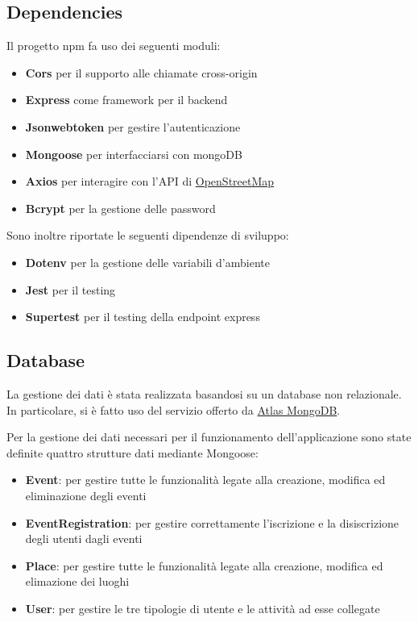 \documentclass[9pt]{extarticle}
\begin{document}
\subsection{Dependencies}

Il progetto npm fa uso dei seguenti moduli:
\begin{itemize}
    \item \textbf{Cors} per il supporto alle chiamate cross-origin
    \item \textbf{Express} come framework per il backend
    \item \textbf{Jsonwebtoken} per gestire l'autenticazione
    \item \textbf{Mongoose} per interfacciarsi con mongoDB
    \item \textbf{Axios} per interagire con l'API di \href{https://www.openstreetmap.org/#map=6/42.09/12.56}{OpenStreetMap}
    \item \textbf{Bcrypt} per la gestione delle password
\end{itemize}

Sono inoltre riportate le seguenti dipendenze di sviluppo:
\begin{itemize}
    \item \textbf{Dotenv} per la gestione delle variabili d'ambiente
    \item \textbf{Jest} per il testing
    \item \textbf{Supertest} per il testing della endpoint express
\end{itemize}

\subsection{Database}

La gestione dei dati è stata realizzata basandosi su un database non
relazionale. In particolare, si è fatto uso del servizio offerto da
\href{https://www.mongodb.com/products/platform/atlas-database}{Atlas MongoDB}.

Per la gestione dei dati necessari per il funzionamento dell'applicazione sono state definite quattro strutture dati mediante Mongoose:
\begin{itemize}
	\item \textbf{Event}: per gestire tutte le funzionalità legate alla creazione, modifica ed eliminazione degli eventi
	\item \textbf{EventRegistration}: per gestire correttamente l'iscrizione e la disiscrizione degli utenti dagli eventi
	\item \textbf{Place}: per gestire tutte le funzionalità legate alla creazione, modifica ed elimazione dei luoghi
	\item \textbf{User}: per gestire le tre tipologie di utente e le attività ad esse collegate
\end{itemize}
\end{document}

